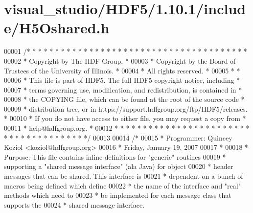 \hypertarget{visual__studio_2_h_d_f5_21_810_81_2include_2_h5_oshared_8h_source}{}\section{visual\+\_\+studio/\+H\+D\+F5/1.10.1/include/\+H5\+Oshared.h}
\label{visual__studio_2_h_d_f5_21_810_81_2include_2_h5_oshared_8h_source}

\begin{DoxyCode}
00001 \textcolor{comment}{/* * * * * * * * * * * * * * * * * * * * * * * * * * * * * * * * * * * * * * *}
00002 \textcolor{comment}{ * Copyright by The HDF Group.                                               *}
00003 \textcolor{comment}{ * Copyright by the Board of Trustees of the University of Illinois.         *}
00004 \textcolor{comment}{ * All rights reserved.                                                      *}
00005 \textcolor{comment}{ *                                                                           *}
00006 \textcolor{comment}{ * This file is part of HDF5.  The full HDF5 copyright notice, including     *}
00007 \textcolor{comment}{ * terms governing use, modification, and redistribution, is contained in    *}
00008 \textcolor{comment}{ * the COPYING file, which can be found at the root of the source code       *}
00009 \textcolor{comment}{ * distribution tree, or in https://support.hdfgroup.org/ftp/HDF5/releases.  *}
00010 \textcolor{comment}{ * If you do not have access to either file, you may request a copy from     *}
00011 \textcolor{comment}{ * help@hdfgroup.org.                                                        *}
00012 \textcolor{comment}{ * * * * * * * * * * * * * * * * * * * * * * * * * * * * * * * * * * * * * * */}
00013 
00014 \textcolor{comment}{/*}
00015 \textcolor{comment}{ * Programmer:  Quincey Koziol <koziol@hdfgroup.org>}
00016 \textcolor{comment}{ *      Friday, January 19, 2007}
00017 \textcolor{comment}{ *}
00018 \textcolor{comment}{ * Purpose: This file contains inline definitions for "generic" routines}
00019 \textcolor{comment}{ *      supporting a "shared message interface" (ala Java) for object}
00020 \textcolor{comment}{ *      header messages that can be shared.  This interface is}
00021 \textcolor{comment}{ *              dependent on a bunch of macros being defined which define}
00022 \textcolor{comment}{ *              the name of the interface and "real" methods which need to}
00023 \textcolor{comment}{ *              be implemented for each message class that supports the}
00024 \textcolor{comment}{ *              shared message interface.}

\end{DoxyCode}
